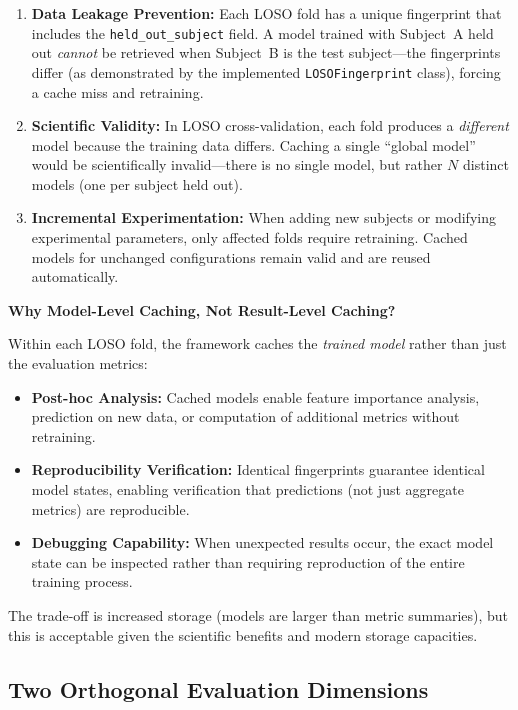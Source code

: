 \documentclass{imc-inf} %
\begin{document}
\begin{enumerate}
    \item \textbf{Data Leakage Prevention:} Each LOSO fold has a unique fingerprint that includes the \texttt{held\_out\_subject} field. A model trained with Subject~A held out \textit{cannot} be retrieved when Subject~B is the test subject---the fingerprints differ (as demonstrated by the implemented \texttt{LOSOFingerprint} class), forcing a cache miss and retraining.
    
    \item \textbf{Scientific Validity:} In LOSO cross-validation, each fold produces a \textit{different} model because the training data differs. Caching a single ``global model'' would be scientifically invalid---there is no single model, but rather $N$ distinct models (one per subject held out).
    
    \item \textbf{Incremental Experimentation:} When adding new subjects or modifying experimental parameters, only affected folds require retraining. Cached models for unchanged configurations remain valid and are reused automatically.
\end{enumerate}

\textbf{Why Model-Level Caching, Not Result-Level Caching?}

Within each LOSO fold, the framework caches the \textit{trained model} rather than just the evaluation metrics:

\begin{itemize}
    \item \textbf{Post-hoc Analysis:} Cached models enable feature importance analysis, prediction on new data, or computation of additional metrics without retraining.
    \item \textbf{Reproducibility Verification:} Identical fingerprints guarantee identical model states, enabling verification that predictions (not just aggregate metrics) are reproducible.
    \item \textbf{Debugging Capability:} When unexpected results occur, the exact model state can be inspected rather than requiring reproduction of the entire training process.
\end{itemize}

The trade-off is increased storage (models are larger than metric summaries), but this is acceptable given the scientific benefits and modern storage capacities.

\subsection{Two Orthogonal Evaluation Dimensions}
\end{document}

